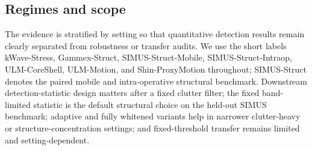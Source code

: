 \documentclass[11pt]{article}
\begin{document}
\subsection{Regimes and scope}
\label{sec:results-overview}

The evidence is stratified by setting so that quantitative detection results remain clearly separated from robustness or transfer audits. We use the short labels kWave-Stress, Gammex-Struct, SIMUS-Struct-Mobile, SIMUS-Struct-Intraop, ULM-CoreShell, ULM-Motion, and Shin-ProxyMotion throughout; SIMUS-Struct denotes the paired mobile and intra-operative structural benchmark. Downstream detection-statistic design matters after a fixed clutter filter; the fixed band-limited statistic is the default structural choice on the held-out SIMUS benchmark; adaptive and fully whitened variants help in narrower clutter-heavy or structure-concentration settings; and fixed-threshold transfer remains limited and setting-dependent.
\end{document}
